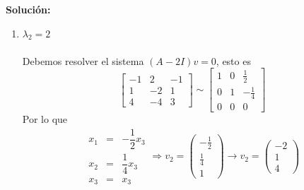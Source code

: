 \documentclass[12pt]{article}
\newenvironment{solucion}
{\begin{mdframed}[backgroundcolor=black!10]
		{\bf Solución:}\\
	}
	{
	\end{mdframed}
}
\newenvironment{preguntas}
{\begin{enumerate}\itemsep12pt
	}
	{
	\end{enumerate}
}
\begin{document}
\begin{preguntas}
\begin{solucion}
\begin{enumerate}[1)]
$$\begin{array}{rcl}
			x_3 & = & x_3
			\end{array} \Longrightarrow
			v_1 = \begin{pmatrix}
			-\frac{1}{2}\\
			\frac{1}{2}\\
			1
			\end{pmatrix} \rightarrow
			v_1 = \begin{pmatrix}
			-1\\
			1\\
			2
			\end{pmatrix}$$
			La solución del sistema es el generado de $v$. Por esto, lo simplificamos al final para obtener un vector propio sin fracciones.
			
			\item $\lambda_2 = 2$\\
			\\
			Debemos resolver el sistema $(A-2I)v = 0$, esto es
			\small$$\begin{bmatrix}
			-1 & 2 & -1\\
			1 & -2 & 1\\
			4 & -4 & 3
			\end{bmatrix} \sim 
			\begin{bmatrix}
			1 & 0 & \frac{1}{2}\\
			0 & 1 & -\frac{1}{4}\\
			0 & 0 & 0
			\end{bmatrix}$$
			Por lo que
			$$\begin{array}{rcl}
			x_1 & = & -\dfrac{1}{2}x_3\\
			x_2 & = & \dfrac{1}{4}x_3\\
			x_3 & = & x_3
			\end{array} \Longrightarrow
			v_2 = \begin{pmatrix}
			-\frac{1}{2}\\
			\frac{1}{4}\\
			1
			\end{pmatrix} \rightarrow
			v_2 = \begin{pmatrix}
			-2\\
			1\\
			4
			\end{pmatrix}$$
			

\end{enumerate}
\end{solucion}
\end{preguntas}
\end{document}
